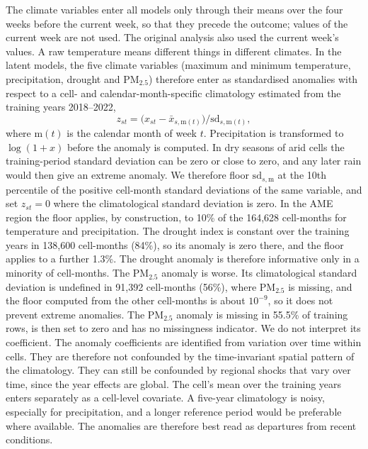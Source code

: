 The climate variables enter all models only through their means over the four weeks
before the current week, so that they precede the outcome; values of the current
week are not used. The original analysis also used the current week's values. A raw temperature
means different things in different climates. In the latent models, the five
climate variables (maximum and minimum temperature, precipitation, drought and
PM$_{2.5}$) therefore enter as standardised anomalies with respect to a cell- and
calendar-month-specific climatology estimated from the training years 2018--2022,
\[
z_{st} = \bigl(x_{st} - \bar{x}_{s,\mathrm{m}(t)}\bigr) / \mathrm{sd}_{s,\mathrm{m}(t)},
\]
where $\mathrm{m}(t)$ is the calendar month of week $t$. Precipitation is
transformed to $\log(1 + x)$ before the anomaly is computed. In dry seasons of arid
cells the training-period standard deviation can be zero or close to zero, and any
later rain would then give an extreme anomaly. We therefore floor
$\mathrm{sd}_{s,\mathrm{m}}$ at the 10th percentile of the positive cell-month
standard deviations of the same variable, and set $z_{st} = 0$ where the
climatological standard deviation is zero. In the AME region the floor applies, by
construction, to 10\% of the 164{,}628 cell-months for temperature and precipitation.
The drought index is constant over the training years in 138{,}600 cell-months (84\%),
so its anomaly is zero there, and the floor applies to a further 1.3\%. The drought
anomaly is therefore informative only in a minority of cell-months. The PM$_{2.5}$
anomaly is worse. Its climatological standard deviation is undefined in 91{,}392
cell-months (56\%), where PM$_{2.5}$ is missing, and the floor computed from the other
cell-months is about $10^{-9}$, so it does not prevent extreme anomalies. The
PM$_{2.5}$ anomaly is missing in 55.5\% of training rows, is then set to zero and has
no missingness indicator. We do not interpret its coefficient. The anomaly coefficients are identified
from variation over time within cells. They are therefore not confounded by the
time-invariant spatial pattern of the climatology. They can still be confounded by
regional shocks that vary over time, since the year effects are global. The cell's
mean over the training years enters separately as a cell-level covariate. A
five-year climatology is noisy, especially for precipitation, and a longer reference
period would be preferable where available. The anomalies are therefore best read
as departures from recent conditions.

